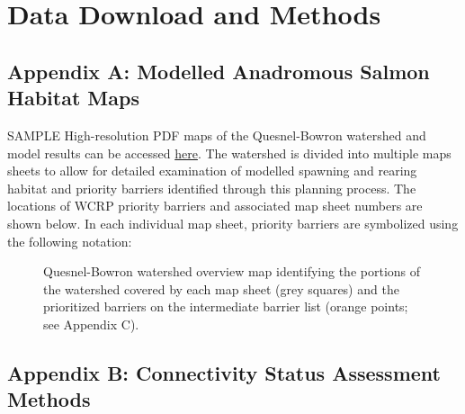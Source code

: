 \documentclass[
  letterpaper,
  DIV=11,
  numbers=noendperiod]{scrreprt}
\begin{document}
\renewcommand*{\arraystretch}{1}

\chapter*{Data Download and Methods}\label{data-download-and-methods}


\section*{Appendix A: Modelled Anadromous Salmon Habitat
Maps}\label{appendix-a-modelled-anadromous-salmon-habitat-maps}


SAMPLE High-resolution PDF maps of the Quesnel-Bowron watershed and
model results can be accessed
\href{https://github.com/smnorris/bcfishpass/tree/main/wcrp/pdfs}{here}.
The watershed is divided into multiple maps sheets to allow for detailed
examination of modelled spawning and rearing habitat and priority
barriers identified through this planning process. The locations of WCRP
priority barriers and associated map sheet numbers are shown below. In
each individual map sheet, priority barriers are symbolized using the
following notation:

\begin{figure}


\caption{\label{fig-over}Quesnel-Bowron watershed overview map
identifying the portions of the watershed covered by each map sheet
(grey squares) and the prioritized barriers on the intermediate barrier
list (orange points; see Appendix C).}

\end{figure}%

\section*{Appendix B: Connectivity Status Assessment
Methods}\label{appendix-b-connectivity-status-assessment-methods}
\end{document}
